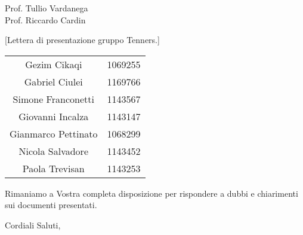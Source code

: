 \begin{letter}{\begin{flushright}
			Prof. Tullio Vardanega \\
			Prof. Riccardo Cardin 
	\end{flushright}}[Lettera di presentazione gruppo Tenners.]
\begin{center}
\begin{tabular}{c c}
    		Gezim Cikaqi & 1069255 \\
    		Gabriel Ciulei & 1169766\\
    		Simone Franconetti & 1143567\\
    		Giovanni Incalza & 1143147 \\
    		Gianmarco Pettinato & 1068299 \\
    		Nicola Salvadore & 1143452 \\
    		Paola Trevisan & 1143253\\
        \end{tabular}
     \end{center}
    Rimaniamo a Vostra completa disposizione per rispondere a dubbi e chiarimenti sui documenti presentati.
    \closing{ Cordiali Saluti,}
\end{letter}